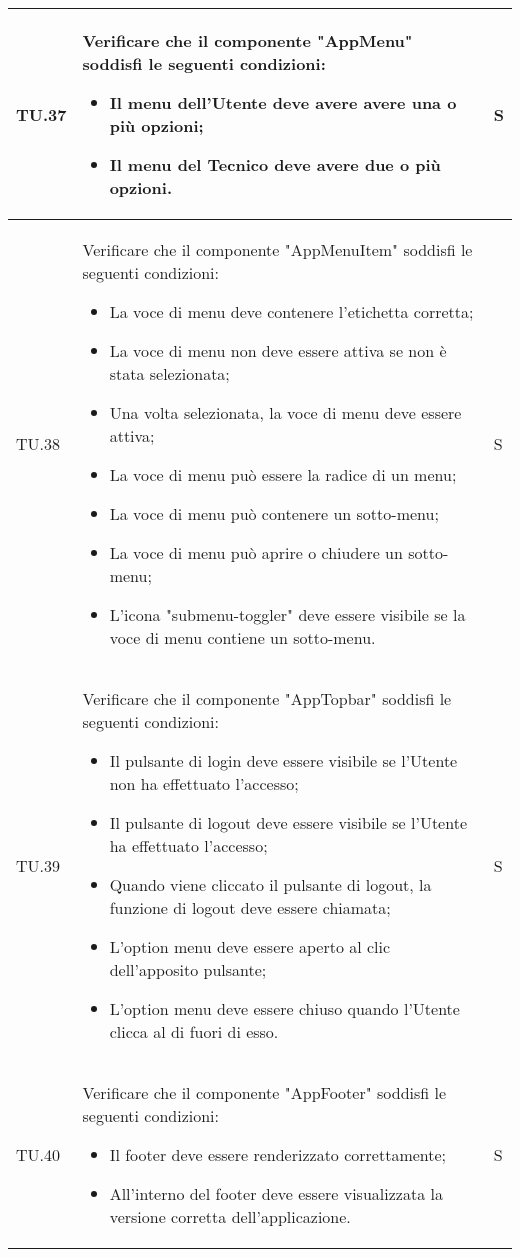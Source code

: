 \begin{adjustwidth}{-0.5cm}{-0.5cm}
\begin{longtable}{|P{1.5cm}|>{\raggedright}P{9.5cm}|>{\arraybackslash}P{1.5cm}|}
		\hline TU.37 & Verificare che il componente "AppMenu" soddisfi le seguenti condizioni:
    \begin{itemize}
      \item Il menu dell'Utente deve avere avere una o più opzioni;
			\item Il menu del Tecnico deve avere due o più opzioni.
    \end{itemize} & S \\

		\hline TU.38 & Verificare che il componente "AppMenuItem" soddisfi le seguenti condizioni:
    \begin{itemize}
      \item La voce di menu deve contenere l'etichetta corretta;
			\item La voce di menu non deve essere attiva se non è stata selezionata;
			\item Una volta selezionata, la voce di menu deve essere attiva;
			\item La voce di menu può essere la radice di un menu;
			\item La voce di menu può contenere un sotto-menu;
			\item La voce di menu può aprire o chiudere un sotto-menu;
			\item L'icona "submenu-toggler" deve essere visibile se la voce di menu contiene un sotto-menu.
    \end{itemize} & S \\

		\hline TU.39 & Verificare che il componente "AppTopbar" soddisfi le seguenti condizioni:
    \begin{itemize}
      \item Il pulsante di login deve essere visibile se l'Utente non ha effettuato l'accesso;
			\item Il pulsante di logout deve essere visibile se l'Utente ha effettuato l'accesso;
			\item Quando viene cliccato il pulsante di logout, la funzione di logout deve essere chiamata;
			\item L'option menu deve essere aperto al clic dell'apposito pulsante;
			\item L'option menu deve essere chiuso quando l'Utente clicca al di fuori di esso.
    \end{itemize} & S \\

		\hline TU.40 & Verificare che il componente "AppFooter" soddisfi le seguenti condizioni:
    \begin{itemize}
      \item Il footer deve essere renderizzato correttamente;
			\item All'interno del footer deve essere visualizzata la versione corretta dell'applicazione.
    \end{itemize} & S \\


\end{longtable}
\end{adjustwidth}
